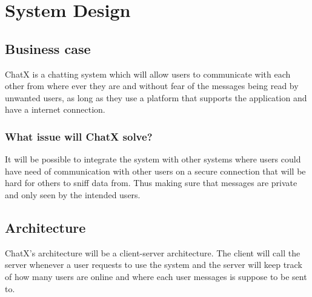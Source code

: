 \chapter{System Design}

\section{Business case}

ChatX is a chatting system which will allow users to communicate with each other from where ever they are and without fear of the messages being read by unwanted users, as long as they use a platform that supports the application and have a internet connection.

\subsection{What issue will ChatX solve?}
It will be possible to integrate the system with other systems where users could have need of communication with other users on a secure connection that will be hard for others to sniff data from. Thus making sure that messages are private and only seen by the intended users.

\section{Architecture}
ChatX's architecture will be a client-server architecture. The client will call the server whenever a user requests to use the system and the server will keep track of how many users are online and where each user messages is suppose to be sent to.
